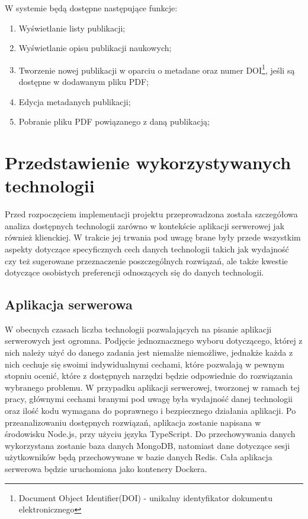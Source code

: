 \documentclass[a4paper,12pt,twoside,openany]{report}
\begin{document}
W systemie będą dostępne następujące funkcje:		
\begin{enumerate}
	\item Wyświetlanie listy publikacji;
	\item Wyświetlanie opisu publikacji naukowych;
	\item Tworzenie nowej publikacji w oparciu o metadane oraz numer DOI\footnote{Document Object Identifier(DOI) - unikalny identyfikator dokumentu elektronicznego }, jeśli są dostępne w dodawanym pliku PDF;
	\item Edycja metadanych publikacji;
	\item Pobranie pliku PDF powiązanego z daną publikacją;
\end{enumerate}
\chapter{Przedstawienie wykorzystywanych technologii}
Przed rozpoczęciem implementacji projektu przeprowadzona została szczegółowa analiza dostępnych technologii zarówno w kontekście aplikacji serwerowej jak również klienckiej. W trakcie jej trwania pod uwagę brane były przede wszystkim aspekty dotyczące specyficznych cech danych technologii takich jak wydajność czy też sugerowane przeznaczenie poszczególnych rozwiązań, ale także kwestie dotyczące osobistych preferencji odnoszących się do danych technologii. 
\section{Aplikacja serwerowa}
W obecnych czasach liczba technologii pozwalających na pisanie aplikacji serwerowych jest ogromna. Podjęcie jednoznacznego wyboru dotyczącego, której z nich należy użyć do danego zadania jest niemalże niemożliwe, jednakże każda z nich cechuje się swoimi indywidualnymi cechami, które pozwalają w pewnym stopniu ocenić, które z dostępnych narzędzi będzie odpowiednie do rozwiązania wybranego problemu. W przypadku aplikacji serwerowej, tworzonej w ramach tej pracy, głównymi cechami branymi pod uwagę była wydajność danej technologii oraz ilość kodu wymagana do poprawnego i bezpiecznego działania aplikacji. Po przeanalizowaniu dostępnych rozwiązań, aplikacja zostanie napisana w środowisku Node.js, przy użyciu języka TypeScript. Do przechowywania danych wykorzystana zostanie baza danych MongoDB, natomiast dane dotyczące sesji użytkowników będą przechowywane w bazie danych Redis. Cała aplikacja serwerowa będzie uruchomiona jako kontenery Dockera.
\end{document}
